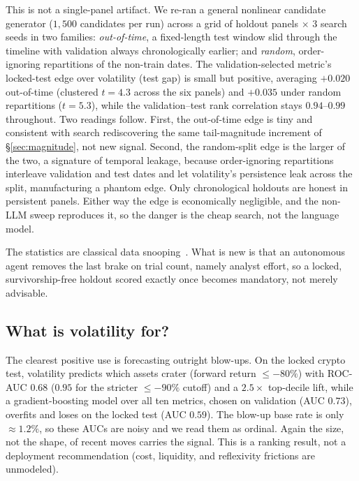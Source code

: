 \documentclass[sigconf,anonymous,nonacm]{acmart}
\begin{document}
This is not a single-panel artifact. We re-ran a general nonlinear candidate generator
($1{,}500$ candidates per run) across a grid of holdout panels $\times$ $3$ search seeds
in two families: \emph{out-of-time}, a fixed-length test window slid through the timeline
with validation always chronologically earlier; and \emph{random}, order-ignoring
repartitions of the non-train dates. The validation-selected metric's locked-test edge over
volatility (test gap) is small but positive, averaging $+0.020$ out-of-time (clustered
$t=4.3$ across the six panels) and $+0.035$ under random repartitions ($t=5.3$), while the
validation--test rank correlation stays $0.94$--$0.99$ throughout. Two readings follow.
First, the out-of-time edge is tiny and consistent with search rediscovering the same
tail-magnitude increment of \S\ref{sec:magnitude}, not new signal. Second, the random-split
edge is the larger of the two, a signature of temporal leakage, because order-ignoring
repartitions interleave validation and test dates and let volatility's persistence leak
across the split, manufacturing a phantom edge. Only chronological holdouts are honest in
persistent panels. Either way the edge is economically negligible, and the non-LLM sweep
reproduces it, so the danger is the cheap search, not the language model.

The statistics are classical data snooping~\cite{white2000,bailey2017}. What is new is
that an autonomous agent removes the last brake on trial count, namely analyst effort, so
a locked, survivorship-free holdout scored exactly once becomes mandatory, not merely
advisable.

\subsection{What is volatility for?}
The clearest positive use is forecasting outright
blow-ups. On the locked crypto test, volatility predicts which assets crater (forward
return $\le -80\%$) with ROC-AUC $0.68$ ($0.95$
for the stricter $\le -90\%$ cutoff) and a $2.5\times$
top-decile lift, while a gradient-boosting model over all ten metrics, chosen on
validation (AUC $0.73$), overfits and loses on the locked test (AUC $0.59$). The
blow-up base rate is only ${\approx}1.2\%$, so these AUCs are noisy and we read them as
ordinal. Again the size, not the shape, of recent moves carries the
signal. This is a ranking result, not a deployment recommendation (cost, liquidity, and
reflexivity frictions are unmodeled).
\end{document}
